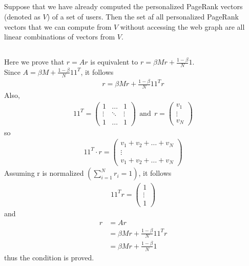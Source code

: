 \documentclass[a4paper,11pt]{article}
\begin{document}
\subsection{}
Suppose that we have already computed the personalized PageRank vectors (denoted as $V$) of a set of users. Then the set af all personalized PageRank vectors that we can compute from $V$ without accessing the web graph
are all linear combinations of vectors from $V$.


\subsection{}
Here we prove that $r = Ar$ is equivalent to $r = \beta M r + \frac{1 - \beta}{N}1$.
\\
Since $A = \beta M + \frac{1 - \beta}{N}11^T$, it follows
\begin{align*}
r = \beta M r + \frac{1 - \beta}{N}11^T r
\end{align*}
Also,
\begin{align*}
11^T = 
    \begin{pmatrix}
        1 & \ldots & 1 \\
        \vdots & \ddots & \vdots \\
        1 & \ldots & 1 
    \end{pmatrix}
\ \ \text{and} \ \ 
r = 
    \begin{pmatrix}
        v_1
        \\
        \vdots
        \\
        v_N
    \end{pmatrix}
\end{align*}
so 
\begin{align*}
    11^T \cdot r = 
    \begin{pmatrix}
        v_1 + v_2 + \ldots + v_N
        \\
        \vdots
        \\
        v_1 + v_2 + \ldots + v_N
    \end{pmatrix}
\end{align*}
Assuming r is normalized $\left( \sum_{i = 1}^{N} r_i = 1 \right)$, it follows
\begin{align*}
    11^T r = 
    \begin{pmatrix}
        1
        \\
        \vdots
        \\
        1
    \end{pmatrix}
\end{align*}
and
\begin{align*}
    r &= Ar 
    \\
    &= \beta M r + \frac{1 - \beta}{N}11^T r
    \\
    &= \beta M r + \frac{1 - \beta}{N} 1
\end{align*}
thus the condition is proved.
\end{document}
